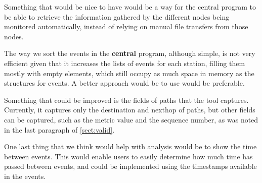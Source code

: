 Something that would be nice to have would be a way for the central program to
be able to retrieve the information gathered by the different nodes being
monitored automatically, instead of relying on manual file transfers from those
nodes.

The way we sort the events in the \textbf{central} program, although simple, is
not very efficient given that it increases the lists of events for each station,
filling them mostly with empty elements, which still occupy as much space in
memory as the structures for events. A better approach would be to use would be
preferable.

Something that could be improved is the fields of paths that the tool captures.
Currently, it captures only the destination and nexthop of paths, but other
fields can be captured, such as the metric value and the sequence number, as was
noted in the last paragraph of \autoref{sect:valid}.

One last thing that we think would help with analysis would be to show the time
between events. This would enable users to easily determine how much time has
passed between events, and could be implemented using the timestamps available
in the events.
